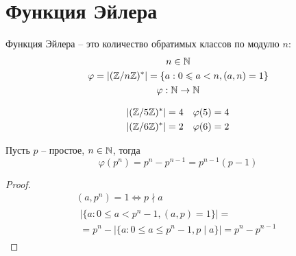 \documentclass[main]{subfiles}
\begin{document}
\chapter{Функция Эйлера}
\begin{definition}
    Функция Эйлера -- это количество обратимых классов по модулю $n$:
    \begin{gather*}
        n\in \mathbb{N}\\
        \varphi = | (\mathbb{Z}/n\mathbb{Z})^*| = \{a: 0\leqslant a<n, (a,n) = 1\}\\
        \varphi: \mathbb{N} \to \mathbb{N}
    \end{gather*}
\end{definition}
\begin{example}
    \begin{align*}
        |(\mathbb{Z}/5\mathbb{Z})^*| & = 4 & \varphi(5) & = 4 \\
        |(\mathbb{Z}/6\mathbb{Z})^*| & = 2 & \varphi(6) & = 2
    \end{align*}
\end{example}

\begin{proposition}
    Пусть $p$ -- простое, $n \in \mathbb{N}$, тогда
    \[\varphi(p^n) = p^n - p^{n-1} = p^{n-1}(p-1)\]
\end{proposition}
\begin{proof}
    \begin{gather*}
        (a, p^n) = 1 \Leftrightarrow p \nmid a\\
        \begin{multlined}
            |\{a: 0 \le a < p^{n}-1,(a, p) =1\}|=\\
            = p^n - |\{a: 0 \le a \le p^n -1, p \mid a\}|= p^n - p^{n-1}
        \end{multlined}
    \end{gather*}
\end{proof}
\end{document}
